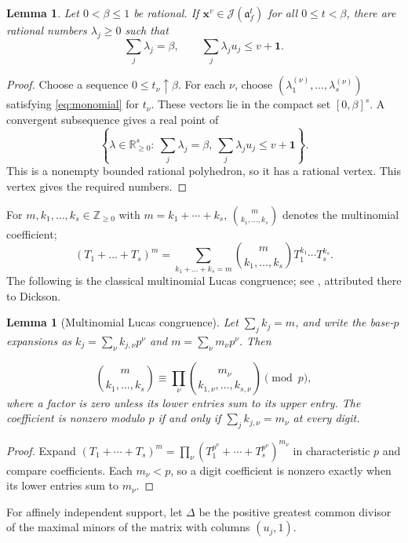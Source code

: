 \documentclass[11pt]{amsart}
\numberwithin{equation}{section}
\newtheorem{lemma}[theorem]{Lemma}
\theoremstyle{definition}
\newcommand{\J}{\mathcal J}
\newcommand{\aideal}{\mathfrak a}
\newcommand{\Z}{\mathbb Z}
\newcommand{\R}{\mathbb R}
\newcommand{\xx}{\boldsymbol{x}}
\newcommand{\one}{\boldsymbol{1}}
\begin{document}
\begin{lemma}\label{lem:closed}
Let $0<\beta\le1$ be rational. If $\xx^v\in\J(\aideal_f^t)$ for all
$0\le t<\beta$, there are rational numbers
$\lambda_j\ge0$ such that
\begin{equation}\label{eq:closed}
 \sum_j\lambda_j=\beta,\qquad \sum_j\lambda_j u_j\le v+\one.
\end{equation}
\end{lemma}
\begin{proof}
Choose a sequence $0\le t_\nu\uparrow\beta$.
For each $\nu$, choose
$(\lambda_1^{(\nu)},\ldots,\lambda_s^{(\nu)})$
satisfying \eqref{eq:monomial} for $t_\nu$.
These vectors lie in the compact set $[0,\beta]^s$.
A convergent subsequence gives a real point of
\[
 \left\{\lambda\in\R_{\ge0}^s:\
  \sum_j\lambda_j=\beta,\ \sum_j\lambda_j u_j\le v+\one\right\}.
\]
This is a nonempty bounded rational polyhedron, so it has a rational
vertex. This vertex gives the required numbers.
\end{proof}
For $m,k_1,\dots,k_s \in \Z_{\ge 0}$ with $m=k_1+\cdots+k_s$, 
$\binom{m}{k_1,\ldots,k_s}$ denotes the multinomial coefficient;
\[
(T_1+\dots+T_s)^m=\sum_{k_1+\dots+k_s =m} \binom{m}{k_1,\ldots,k_s}T_1^{k_1} \cdots T_s^{k_s}. 
\]
The following is the classical multinomial Lucas congruence; see
\cite[Theorem~2.1]{HTWF}, attributed there to Dickson.
\begin{lemma}[Multinomial Lucas congruence]\label{lem:lucas}
Let $\sum_jk_j=m$, and write the base-$p$ expansions as
$k_j=\sum_\nu k_{j,\nu}p^\nu$ and $m=\sum_\nu m_\nu p^\nu$.
Then

\[
 \binom{m}{k_1,\ldots,k_s}
 \equiv\prod_\nu\binom{m_\nu}{k_{1,\nu},\ldots,k_{s,\nu}}\pmod p,
\]
where a factor is zero unless its lower entries sum to its upper entry.
The coefficient is nonzero modulo $p$ if and only if
$\sum_jk_{j,\nu}=m_\nu$ at every digit.
\end{lemma}
\begin{proof}
Expand
$(T_1+\cdots+T_s)^m=\prod_\nu(T_1^{p^\nu}+\cdots+T_s^{p^\nu})^{m_\nu}$
in characteristic $p$ and compare coefficients.
Each $m_\nu<p$, so a digit coefficient is nonzero exactly when its lower
entries sum to $m_\nu$.
\end{proof}

For affinely independent support, let $\Delta$ be the positive greatest
common divisor of the maximal minors of the matrix with columns $(u_j,1)$.
\end{document}
